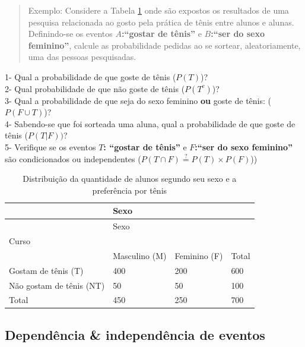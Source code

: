 \documentclass[
]{book}
\begin{document}
\hfill\break

\begin{quote}
Exemplo: Considere a Tabela \ref{tab:table5} onde são expostos os resultados de uma pesquisa relacionada ao gosto pela prática de tênis entre alunos e alunas. Definindo-se os eventos \textbf{\(A\):``gostar de tênis''} e \textbf{\(B\):``ser do sexo feminino''}, calcule as probabilidade pedidas ao se sortear, aleatoriamente, uma das pessoas pesquisadas.
\end{quote}

\hfill\break

1- Qual a probabilidade de que goste de tênis (\(P(T)\))?\\
2- Qual probabilidade de que não goste de tênis (\(P(T^{c})\))?\\
3- Qual a probabilidade de que seja do sexo feminino \textbf{ou} goste de tênis: (\(P(F \cup T)\))?\\
4- Sabendo-se que foi sorteada uma aluna, qual a probabilidade de que goste de tênis (\(P(T|F))\)?\\
5- Verifique se os eventos \textbf{\(T\): ``gostar de tênis''} e \textbf{\(F\):``ser do sexo feminino''} são condicionados ou independentes (\(P(T \cap F) \stackrel{?}{=} P(T) \times P(F)\)))

\hfill\break

\begin{longtable}[]{@{}llll@{}}
\caption{\label{tab:table5} Distribuição da quantidade de alunos segundo seu sexo e a preferência por tênis}\tabularnewline
\toprule()
& Sexo & & \\
\midrule()
\endfirsthead
\toprule()
& Sexo & & \\
\midrule()
\endhead
Curso & & & \\
& Masculino (M) & Feminino (F) & Total \\
Gostam de tênis (T) & 400 & 200 & 600 \\
Não gostam de tênis (NT) & 50 & 50 & 100 \\
Total & 450 & 250 & 700 \\
\bottomrule()
\end{longtable}

\hypertarget{dependuxeancia-independuxeancia-de-eventos}{%
\subsection{Dependência \& independência de eventos}\label{dependuxeancia-independuxeancia-de-eventos}}
\end{document}

